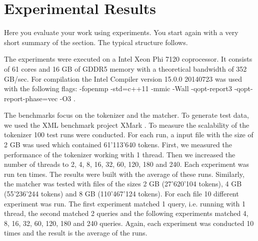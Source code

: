 
\section{Experimental Results}\label{sec:exp}


Here you evaluate your work using experiments. You start again with a
very short summary of the section. The typical structure follows.

 The experiments were executed on a Intel Xeon Phi 7120 coprocessor. It consists of 61 cores and 16 GB of GDDR5 memory with a theoretical bandwidth of 352 GB/sec.
For compilation the Intel Compiler version 15.0.0 20140723 was used with the following flags: -fopenmp -std=c++11 -mmic -Wall -qopt-report3 -qopt-report-phase=vec -O3 .

The benchmarks focus on the tokenizer and the matcher. To generate test data, we used the XML benchmark project XMark . To measure the scalability of the tokenizer 100 test runs were conducted. For each run, a input file with the size of 2 GB was used which contained 61'113'640 tokens. First, we measured the performance of the tokenizer working with 1 thread. Then we increased the number of threads to 2, 4, 8, 16, 32, 60, 120, 180 and 240. Each experiment was run ten times. The results were built with the average of these runs. Similarly, the matcher was tested with files of the sizes 2 GB (27'620'104 tokens), 4 GB (55'236'244 tokens) and 8 GB (110'467'124 tokens). For each file 10 different experiment was run. The first experiment matched 1 query, i.e. running with 1 thread, the second matched 2 queries and the following experiments matched 4, 8, 16, 32, 60, 120, 180 and 240 queries. Again, each experiment was conducted 10 times and the result is the average of the runs.

